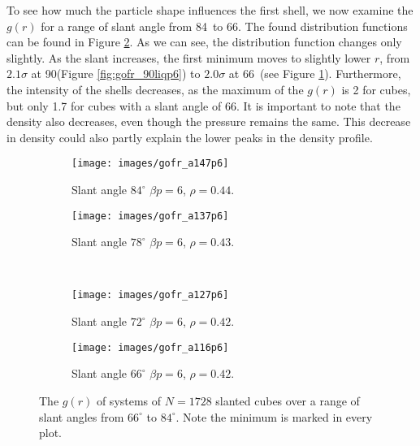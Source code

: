 \documentclass[thesis]{subfiles}
\begin{document}
To see how much the particle shape influences the first shell, we now examine the $g(r)$ for a range of slant angle from 84\degr\ to 66\degr. The found distribution functions can be found in Figure \ref{fig:gofr_non90liq}. As we can see, the distribution function changes only slightly. As the slant increases, the first minimum moves to slightly lower $r$, from $2.1\sigma$ at 90\degr (Figure \ref{fig:gofr_90liqp6}) to $2.0\sigma$ at 66\degr\ (see Figure \ref{fig:gofr_non90liqa66}). Furthermore, the intensity of the shells decreases, as the maximum of the $g(r)$ is 2 for cubes, but only 1.7 for cubes with a slant angle of 66\degr. It is important to note that the density also decreases, even though the pressure remains the same. This decrease in density could also partly explain the lower peaks in the density profile.

\begin{figure}[H]
	\centering
	\begin{subfigure}{0.49\textwidth}
		\texttt{[image: images/gofr\_a147p6]}
		\caption{Slant angle $84^\circ$ $\beta p = 6$, $\rho = 0.44$. }
	\end{subfigure}
	\begin{subfigure}{0.49\textwidth}
		\texttt{[image: images/gofr\_a137p6]}
		\caption{Slant angle $78^\circ$ $\beta p = 6$, $\rho = 0.43$. }
	\end{subfigure}
	\\
	\vspace{10pt}
	\begin{subfigure}{0.49\textwidth}
		\texttt{[image: images/gofr\_a127p6]}
		\caption{Slant angle $72^\circ$ $\beta p = 6$, $\rho = 0.42$. }
	\end{subfigure}
	\begin{subfigure}{0.49\textwidth}
		\texttt{[image: images/gofr\_a116p6]}
		\caption{Slant angle $66^\circ$ $\beta p = 6$, $\rho = 0.42$. }\label{fig:gofr_non90liqa66}
	\end{subfigure}
	
	\caption{The $g(r)$ of systems of $N = 1728$ slanted cubes over a range of slant angles from $66^\circ$ to $84^\circ$. Note the minimum is marked in every plot.}\label{fig:gofr_non90liq}
\end{figure}

\end{document}
